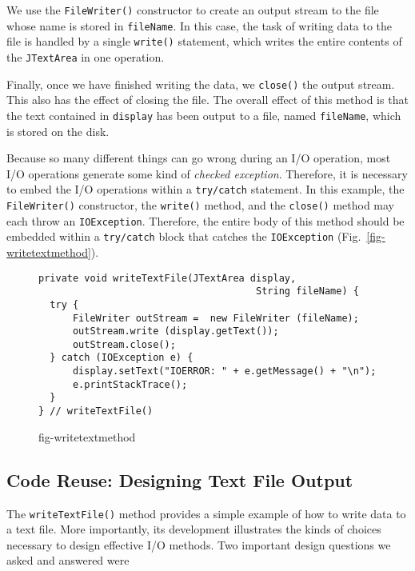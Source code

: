 \noindent We use the {\tt FileWriter()} constructor to create an 
output stream to the file whose name is stored in {\tt fileName}.
In this case, the task of writing data to the file is handled by a
single {\tt write()} statement, which writes the entire contents of
the {\tt JTextArea} in one operation.

Finally, once we have finished writing the data, we {\tt close()} the
output stream.  This also has the effect of closing the file.  The
overall effect of this method is that the text contained in
{\tt display} has been output to a file, named {\tt fileName}, which is
stored on the disk.


\noindent Because so many different things can go wrong during an I/O operation,
most I/O operations generate some kind of {\it checked exception}.
Therefore, it is necessary to embed the I/O operations within a {\tt try/catch}
statement.  In this example, the {\tt FileWriter()} constructor, the
{\tt write()} method, and the {\tt close()} method may each throw an
{\tt IOException}. Therefore, the entire body of this method should be
embedded within a {\tt try/catch} block that catches the
{\tt IOException} (Fig.~\ref{fig-writetextmethod}).

\begin{figure}[tb]
\jjjprogstart
\begin{jjjlisting}[26.5pc]
\begin{lstlisting}
private void writeTextFile(JTextArea display, 
                                      String fileName) {
  try {
      FileWriter outStream =  new FileWriter (fileName);
      outStream.write (display.getText());
      outStream.close();
  } catch (IOException e) {
      display.setText("IOERROR: " + e.getMessage() + "\n");
      e.printStackTrace();
  }
} // writeTextFile()
\end{lstlisting}
\end{jjjlisting}
{fig-writetextmethod}
\end{figure}


\subsection{Code Reuse: Designing Text File Output}
\noindent The {\tt writeTextFile()} method provides a simple example of how to
write data to a text file.   More importantly, its development
illustrates the kinds of choices necessary to design effective
I/O methods.  Two important design questions we asked and answered
were

